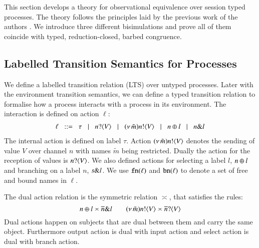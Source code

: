 \noi This section develops a theory for observational equivalence over
session typed \HOp processes. The theory follows the principles
laid by the previous work of the authors
\cite{DBLP:conf/forte/KouzapasYH11,KY13,dkphdthesis}.
We introduce three different bisimulations and prove 
all of them coincide with typed, reduction-closed,
barbed congruence. 

\subsection{Labelled Transition Semantics for Processes}\label{ss:lts}
\noi We define a labelled transition relation (LTS) over
untyped processes. 
Later with the environment transition semantics, 
we can define a typed transition relation to formalise 
how a process interacts with a process in its environment. The interaction
is defined on action $\ell$:
\[
\begin{array}{l}
		\ell	\;\;::=\;\;   \tau 
		\;\;\;|\;\;\;n ? \langle V \rangle 
			\;\;\;|\;\;\; (\nu\, \tilde{m}) n ! \langle V \rangle
			\;\;\;|\;\;\;  n \oplus l 
			\;\;\;|\;\;\; n \& l 
\end{array}
\]
\noi The internal action is defined on label $\tau$.
Action $(\nu\, \tilde{m}) n ! \langle V \rangle$ denotes the sending of value $V$ over channel $n$ with
names $\tilde{m}$ being restricted.
Dually the action for the reception of values is 
$n ? \langle V \rangle$.
We also defined actions for selecting a label $l$, 
$n \oplus l$ and branching on a label
$n$, $s \& l$.
We use $\mathtt{fn}(\ell)$ and $\mathtt{bn}(\ell)$ to denote 
a set of free and bound names in $\ell$. 

The dual action relation is the symmetric relation $\asymp$, that satisfies the rules:
\[
	n \oplus l \asymp \overline{n} \& l
	\qquad
	(\nu\, \tilde{m}) n ! \langle V \rangle \asymp \overline{n} ? \langle V \rangle
\]
Dual actions happen on subjects that are dual between them and carry the same
object. Furthermore output action is dual with input action and 
select action is dual with branch action.

\smallskip

